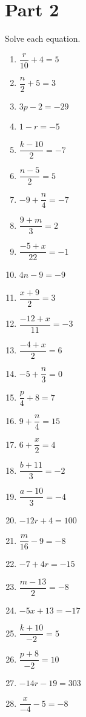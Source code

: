 \documentclass[10pt]{article}
\theoremstyle{definition}
\theoremstyle{plain}
\numberwithin{equation}{section}
\begin{document}
\section*{Part 2}
\begin{multicolblock}{Solve each equation.}
  \begin{enumerate}
    \item $\dfrac{r}{10}+4=5$
    \item $\dfrac{n}{2}+5=3$
    \item $3p-2=-29$
    \item $1-r=-5$
    \item $\dfrac{k-10}{2}=-7$
    \item $\dfrac{n-5}{2}=5$
    \item $-9+\dfrac{n}{4}=-7$
    \item $\dfrac{9+m}{3}=2$
    \item $\dfrac{-5+x}{22}=-1$
    \item $4n-9=-9$
    \item $\dfrac{x+9}{2}=3$
    \item $\dfrac{-12+x}{11}=-3$
    \item $\dfrac{-4+x}{2}=6$
    \item $-5+\dfrac{n}{3}=0$
    \item $\dfrac{p}{4}+8=7$
    \item $9+\dfrac{n}{4}=15$
    \item $6+\dfrac{x}{2}=4$
    \item $\dfrac{b+11}{3}=-2$
    \item $\dfrac{a-10}{3}=-4$
    \item $-12r+4=100$
    \item $\dfrac{m}{16}-9=-8$
    \item $-7+4r=-15$
    \item $\dfrac{m-13}{2}=-8$
    \item $-5x+13=-17$
    \item $\dfrac{k+10}{-2}=5$
    \item $\dfrac{p+8}{-2}=10$
    \item $-14r-19=303$
    \item $\dfrac{x}{-4}-5=-8$
  \end{enumerate}
\end{multicolblock}
\end{document}
